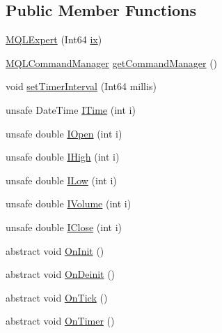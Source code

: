 \subsection*{Public Member Functions}
\begin{DoxyCompactItemize}
\item 
\hyperlink{class_m_q_l4_c_sharp_1_1_base_1_1_m_q_l_1_1_m_q_l_expert_a4be33d454bf8125a1668a76b46bc195b}{M\+Q\+L\+Expert} (Int64 \hyperlink{class_m_q_l4_c_sharp_1_1_base_1_1_m_q_l_1_1_m_q_l_expert_a98b5a835bb18c023f5160275efa74619}{ix})
\item 
\hyperlink{class_m_q_l4_c_sharp_1_1_base_1_1_m_q_l_1_1_m_q_l_command_manager}{M\+Q\+L\+Command\+Manager} \hyperlink{class_m_q_l4_c_sharp_1_1_base_1_1_m_q_l_1_1_m_q_l_expert_af0ef6f8df3a3ec85b217e1532566c337}{get\+Command\+Manager} ()
\item 
void \hyperlink{class_m_q_l4_c_sharp_1_1_base_1_1_m_q_l_1_1_m_q_l_expert_abde5a0bb179851849d17966f07ac143a}{set\+Timer\+Interval} (Int64 millis)
\item 
unsafe Date\+Time \hyperlink{class_m_q_l4_c_sharp_1_1_base_1_1_m_q_l_1_1_m_q_l_expert_afdf9f78e3c075454ed536ee2bfb1c0e1}{I\+Time} (int i)
\item 
unsafe double \hyperlink{class_m_q_l4_c_sharp_1_1_base_1_1_m_q_l_1_1_m_q_l_expert_affedb54bbe01c4d28bfb16d0abf3e8fa}{I\+Open} (int i)
\item 
unsafe double \hyperlink{class_m_q_l4_c_sharp_1_1_base_1_1_m_q_l_1_1_m_q_l_expert_a7c9728c9661a6f3c1d64fcd195016985}{I\+High} (int i)
\item 
unsafe double \hyperlink{class_m_q_l4_c_sharp_1_1_base_1_1_m_q_l_1_1_m_q_l_expert_aabd334eed9185e68200c424f394de932}{I\+Low} (int i)
\item 
unsafe double \hyperlink{class_m_q_l4_c_sharp_1_1_base_1_1_m_q_l_1_1_m_q_l_expert_a5cb5e433bf307df755df30009b5c2aef}{I\+Volume} (int i)
\item 
unsafe double \hyperlink{class_m_q_l4_c_sharp_1_1_base_1_1_m_q_l_1_1_m_q_l_expert_af611fb641dffb1e42fc1eafc0c9ba524}{I\+Close} (int i)
\item 
abstract void \hyperlink{class_m_q_l4_c_sharp_1_1_base_1_1_m_q_l_1_1_m_q_l_expert_a12a41e3d72e84b8c7d8f557b68ddb499}{On\+Init} ()
\item 
abstract void \hyperlink{class_m_q_l4_c_sharp_1_1_base_1_1_m_q_l_1_1_m_q_l_expert_ade810aec8dce22f26f5076564258979b}{On\+Deinit} ()
\item 
abstract void \hyperlink{class_m_q_l4_c_sharp_1_1_base_1_1_m_q_l_1_1_m_q_l_expert_a98020af67b64773a7e9fae1674e9abca}{On\+Tick} ()
\item 
abstract void \hyperlink{class_m_q_l4_c_sharp_1_1_base_1_1_m_q_l_1_1_m_q_l_expert_abbb203face0fb19cb1715b5f7cf6473d}{On\+Timer} ()
\end{DoxyCompactItemize}
